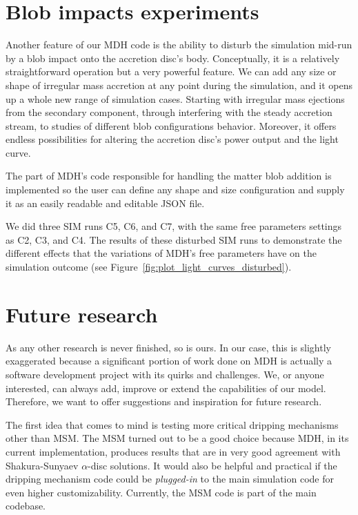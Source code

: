 \section{Blob impacts experiments}
    Another feature of our MDH code is the ability to disturb the simulation mid-run by a blob impact onto the accretion disc's body. Conceptually, it is a relatively straightforward operation but a very powerful feature. We can add any size or shape of irregular mass accretion at any point during the simulation, and it opens up a whole new range of simulation cases. Starting with irregular mass ejections from the secondary component, through interfering with the steady accretion stream, to studies of different blob configurations behavior. Moreover, it offers endless possibilities for altering the accretion disc's power output and the light curve. 

    The part of MDH's code responsible for handling the matter blob addition is implemented so the user can define any shape and size configuration and supply it as an easily readable and editable JSON file.

    We did three SIM runs C5, C6, and C7, with the same free parameters settings as C2, C3, and C4. The results of these disturbed SIM runs to demonstrate the different effects that the variations of MDH's free parameters have on the simulation outcome (see Figure~\ref{fig:plot_light_curves_disturbed}).

\section{Future research}
    As any other research is never finished, so is ours. In our case, this is slightly exaggerated because a significant portion of work done on MDH is actually a software development project with its quirks and challenges. We, or anyone interested, can always add, improve or extend the capabilities of our model. Therefore, we want to offer suggestions and inspiration for future research. 

    The first idea that comes to mind is testing more critical dripping mechanisms other than MSM. The MSM turned out to be a good choice because MDH, in its current implementation, produces results that are in very good agreement with Shakura-Sunyaev $\alpha$-disc solutions. It would also be helpful and practical if the dripping mechanism code could be \emph{plugged-in} to the main simulation code for even higher customizability. Currently, the MSM code is part of the main codebase. 

